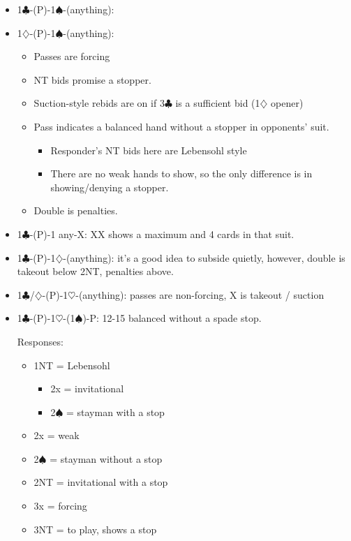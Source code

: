 \documentclass[a4paper,14pt]{extarticle}
\begin{document}
\begin{itemize}
\item 1$\clubsuit$-(P)-1$\spadesuit$-(anything):
\item 1$\diamondsuit$-(P)-1$\spadesuit$-(anything):
\begin{itemize}
   \item Passes are forcing
   \item NT bids promise a stopper.
   \item Suction-style rebids are on if 3$\clubsuit$ is a sufficient bid (1$\diamondsuit$ opener)
   \item Pass indicates a balanced hand without a stopper in opponents' suit.
	\begin{itemize}
      \item Responder's NT bids here are Lebensohl style 
      \item There are no weak hands to show, so the only difference is in showing/denying a stopper.
	\end{itemize}
   \item Double is penalties.
\end{itemize}

\item 1$\clubsuit$-(P)-1 any-X: XX shows a maximum and 4 cards in that suit.

\item 1$\clubsuit$-(P)-1$\diamondsuit$-(anything): it's a good idea to subside quietly, however, double is takeout below 2NT, penalties above.

\item 1$\clubsuit$/$\diamondsuit$-(P)-1$\heartsuit$-(anything): passes are non-forcing, X is takeout / suction

\item 1$\clubsuit$-(P)-1$\heartsuit$-(1$\spadesuit$)-P: 12-15 balanced without a spade stop.

Responses:
	\begin{itemize}
	\item 1NT = Lebensohl
		\begin{itemize}
		\item 2x = invitational
		\item 2$\spadesuit$ = stayman with a stop
		\end{itemize}
	\item 2x = weak
	\item 2$\spadesuit$ = stayman without a stop
	\item 2NT = invitational with a stop
	\item 3x = forcing
	\item 3NT = to play, shows a stop
	\end{itemize}

\end{itemize}
\end{document}

